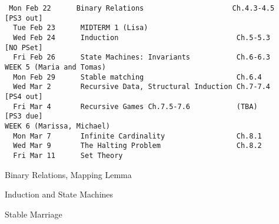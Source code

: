 \documentclass[quiz]{mcs}
\begin{document}

\begin{staffnotes}

\begin{verbatim}
 Mon Feb 22      Binary Relations                     Ch.4.3-4.5           [PS3 out]
  Tue Feb 23      MIDTERM 1 (Lisa)
  Wed Feb 24      Induction                            Ch.5-5.3             [NO PSet]
  Fri Feb 26      State Machines: Invariants           Ch.6-6.3
WEEK 5 (Maria and Tomas)
  Mon Feb 29      Stable matching                      Ch.6.4
  Wed Mar 2       Recursive Data, Structural Induction Ch.7-7.4             [PS4 out]
  Fri Mar 4       Recursive Games Ch.7.5-7.6           (TBA)                [PS3 due]
WEEK 6 (Marissa, Michael)
  Mon Mar 7       Infinite Cardinality                 Ch.8.1
  Wed Mar 9       The Halting Problem                  Ch.8.2
  Fri Mar 11      Set Theory     
\end{verbatim}
\end{staffnotes}

\begin{staffnotes}
\begin{center}
{\large Binary Relations, Mapping Lemma}
\end{center}
\end{staffnotes}

%

\begin{staffnotes}
\begin{center}
{\large Induction and State Machines}
\end{center}
\end{staffnotes}


\examspace

\begin{staffnotes}
\begin{center}
{\large Stable Marriage}
\end{center}
\end{staffnotes}

\end{document}
